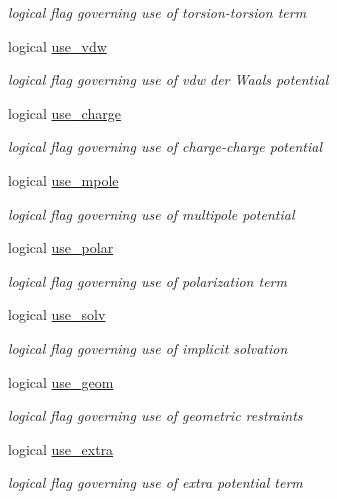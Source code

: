 \begin{DoxyCompactItemize}
\begin{DoxyCompactList}\small\item\em logical flag governing use of torsion-\/torsion term \end{DoxyCompactList}\item 
logical \hyperlink{classpotent_a1cba9006f347c796cd3d2be4eba3d5da}{use\-\_\-vdw}
\begin{DoxyCompactList}\small\item\em logical flag governing use of vdw der Waals potential \end{DoxyCompactList}\item 
logical \hyperlink{classpotent_a8f222bf9cf2bda7af98a4ea15d0cd6cf}{use\-\_\-charge}
\begin{DoxyCompactList}\small\item\em logical flag governing use of charge-\/charge potential \end{DoxyCompactList}\item 
logical \hyperlink{classpotent_a3378eb96a0d00f5db14bef5c7b5e8a65}{use\-\_\-mpole}
\begin{DoxyCompactList}\small\item\em logical flag governing use of multipole potential \end{DoxyCompactList}\item 
logical \hyperlink{classpotent_a0117aacb8fad6e63b030bda76b51784e}{use\-\_\-polar}
\begin{DoxyCompactList}\small\item\em logical flag governing use of polarization term \end{DoxyCompactList}\item 
logical \hyperlink{classpotent_ad939cbd8d4c142586515412465220ee8}{use\-\_\-solv}
\begin{DoxyCompactList}\small\item\em logical flag governing use of implicit solvation \end{DoxyCompactList}\item 
logical \hyperlink{classpotent_a61dd7cbf1cf0f3b97223b23fe7711a19}{use\-\_\-geom}
\begin{DoxyCompactList}\small\item\em logical flag governing use of geometric restraints \end{DoxyCompactList}\item 
logical \hyperlink{classpotent_adb62b9a41bba5ee8b80057a1d68a499b}{use\-\_\-extra}
\begin{DoxyCompactList}\small\item\em logical flag governing use of extra potential term \end{DoxyCompactList}\item 

\end{DoxyCompactItemize}
